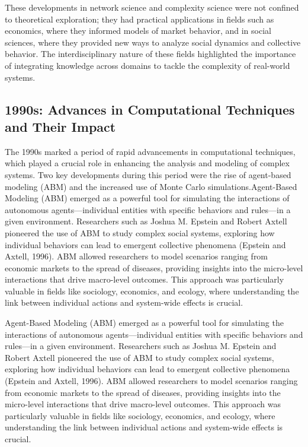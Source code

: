 \documentclass[twocolumn]{article}
\begin{document}
\textcolor{secondary}{These developments in network science and complexity science were not confined to theoretical exploration; they had practical applications in fields such as economics, where they informed models of market behavior, and in social sciences, where they provided new ways to analyze social dynamics and collective behavior. The interdisciplinary nature of these fields highlighted the importance of integrating knowledge across domains to tackle the complexity of real-world systems.}

\subsection{1990s: Advances in Computational Techniques and Their Impact}


\textcolor{primary}{The 1990s marked a period of rapid advancements in computational techniques, which played a crucial role in enhancing the analysis and modeling of complex systems. Two key developments during this period were the rise of agent-based modeling (ABM) and the increased use of Monte Carlo simulations.Agent-Based Modeling (ABM) emerged as a powerful tool for simulating the interactions of autonomous agents—individual entities with specific behaviors and rules—in a given environment. Researchers such as Joshua M. Epstein and Robert Axtell pioneered the use of ABM to study complex social systems, exploring how individual behaviors can lead to emergent collective phenomena (Epstein and Axtell, 1996). ABM allowed researchers to model scenarios ranging from economic markets to the spread of diseases, providing insights into the micro-level interactions that drive macro-level outcomes. This approach was particularly valuable in fields like sociology, economics, and ecology, where understanding the link between individual actions and system-wide effects is crucial.}


\textcolor{secondary}{Agent-Based Modeling (ABM) emerged as a powerful tool for simulating the interactions of autonomous agents—individual entities with specific behaviors and rules—in a given environment. Researchers such as Joshua M. Epstein and Robert Axtell pioneered the use of ABM to study complex social systems, exploring how individual behaviors can lead to emergent collective phenomena (Epstein and Axtell, 1996). ABM allowed researchers to model scenarios ranging from economic markets to the spread of diseases, providing insights into the micro-level interactions that drive macro-level outcomes. This approach was particularly valuable in fields like sociology, economics, and ecology, where understanding the link between individual actions and system-wide effects is crucial.}
\end{document}

